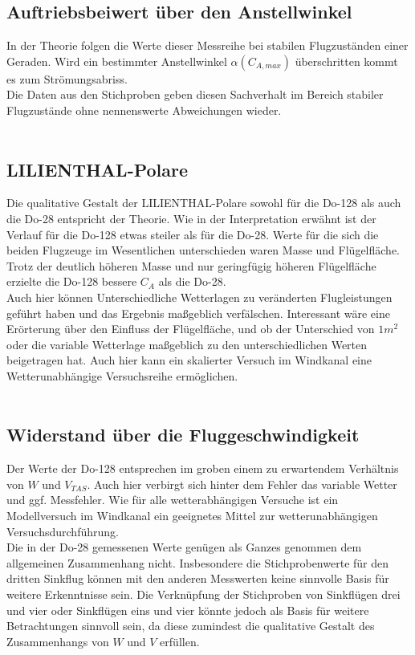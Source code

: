 \subsection{Auftriebsbeiwert über den Anstellwinkel}

In der Theorie folgen die Werte dieser Messreihe bei stabilen Flugzuständen einer Geraden. Wird ein bestimmter Anstellwinkel $\alpha({C_{A,max}})$ überschritten kommt es zum Strömungsabriss.\\
Die Daten aus den Stichproben geben diesen Sachverhalt im Bereich stabiler Flugzustände ohne nennenswerte Abweichungen wieder.\\\\

\subsection{LILIENTHAL-Polare}

Die qualitative Gestalt der LILIENTHAL-Polare sowohl für die Do-128 als auch die Do-28 entspricht der Theorie. Wie in der Interpretation erwähnt ist der Verlauf für die Do-128 etwas steiler als für die Do-28. Werte für die sich die beiden Flugzeuge im Wesentlichen unterschieden waren Masse und Flügelfläche. Trotz der deutlich höheren Masse und nur geringfügig höheren Flügelfläche erzielte die Do-128 bessere $C_{A}$ als die Do-28.\\
Auch hier können Unterschiedliche Wetterlagen zu veränderten Flugleistungen geführt haben und das Ergebnis maßgeblich verfälschen.
Interessant wäre eine Erörterung über den Einfluss der Flügelfläche, und ob der Unterschied von $1m^{2}$ oder die variable Wetterlage maßgeblich zu den unterschiedlichen Werten beigetragen hat. Auch hier kann ein skalierter Versuch im Windkanal eine Wetterunabhängige Versuchsreihe ermöglichen.\\\\

\subsection{Widerstand über die Fluggeschwindigkeit}

Der Werte der Do-128 entsprechen im groben einem zu erwartendem Verhältnis von $W$ und $V_{TAS}$. Auch hier verbirgt sich hinter dem Fehler das variable Wetter und ggf. Messfehler. Wie für alle wetterabhängigen Versuche ist ein Modellversuch im Windkanal ein geeignetes Mittel zur wetterunabhängigen Versuchsdurchführung.\\
Die in der Do-28 gemessenen Werte genügen als Ganzes genommen dem allgemeinen Zusammenhang nicht. Insbesondere die Stichprobenwerte für den dritten Sinkflug können mit den anderen Messwerten keine sinnvolle Basis für weitere Erkenntnisse sein.
Die Verknüpfung der Stichproben von Sinkflügen drei und vier oder Sinkflügen eins und vier könnte jedoch als Basis für weitere Betrachtungen sinnvoll sein, da diese zumindest die qualitative Gestalt des Zusammenhangs von $W$ und $V$ erfüllen.\\\\

